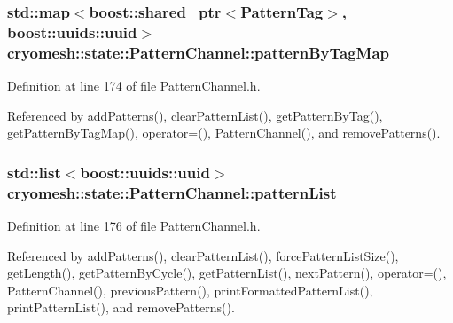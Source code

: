 \hypertarget{classcryomesh_1_1state_1_1PatternChannel_a5155045e7e94fc10a1d60e418bf82b71}{
\subsubsection[{pattern\-By\-Tag\-Map}]{\setlength{\rightskip}{0pt plus 5cm}std\-::map$<$boost\-::shared\-\_\-ptr$<${\bf \-Pattern\-Tag}$>$, boost\-::uuids\-::uuid$>$ {\bf cryomesh\-::state\-::\-Pattern\-Channel\-::pattern\-By\-Tag\-Map}}}\label{classcryomesh_1_1state_1_1PatternChannel_a5155045e7e94fc10a1d60e418bf82b71}


\-Definition at line 174 of file \-Pattern\-Channel.\-h.



\-Referenced by add\-Patterns(), clear\-Pattern\-List(), get\-Pattern\-By\-Tag(), get\-Pattern\-By\-Tag\-Map(), operator=(), \-Pattern\-Channel(), and remove\-Patterns().

\hypertarget{classcryomesh_1_1state_1_1PatternChannel_a71800edd10923b7b00f0c292414b4ba1}{
\subsubsection[{pattern\-List}]{\setlength{\rightskip}{0pt plus 5cm}std\-::list$<$boost\-::uuids\-::uuid$>$ {\bf cryomesh\-::state\-::\-Pattern\-Channel\-::pattern\-List}}}\label{classcryomesh_1_1state_1_1PatternChannel_a71800edd10923b7b00f0c292414b4ba1}


\-Definition at line 176 of file \-Pattern\-Channel.\-h.



\-Referenced by add\-Patterns(), clear\-Pattern\-List(), force\-Pattern\-List\-Size(), get\-Length(), get\-Pattern\-By\-Cycle(), get\-Pattern\-List(), next\-Pattern(), operator=(), \-Pattern\-Channel(), previous\-Pattern(), print\-Formatted\-Pattern\-List(), print\-Pattern\-List(), and remove\-Patterns().

